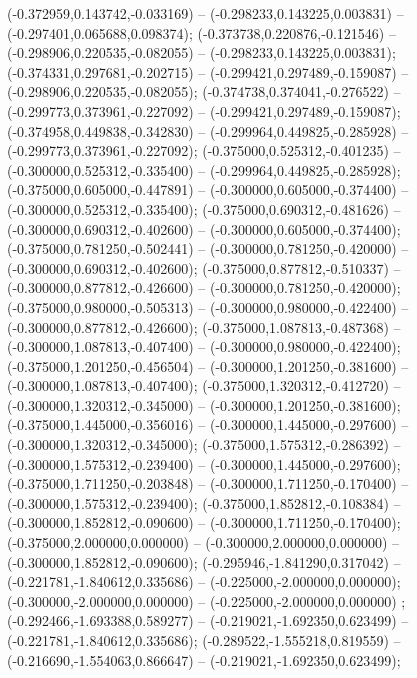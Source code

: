  (-0.372959,0.143742,-0.033169) -- (-0.298233,0.143225,0.003831) -- (-0.297401,0.065688,0.098374);
 (-0.373738,0.220876,-0.121546) -- (-0.298906,0.220535,-0.082055) -- (-0.298233,0.143225,0.003831);
 (-0.374331,0.297681,-0.202715) -- (-0.299421,0.297489,-0.159087) -- (-0.298906,0.220535,-0.082055);
 (-0.374738,0.374041,-0.276522) -- (-0.299773,0.373961,-0.227092) -- (-0.299421,0.297489,-0.159087);
 (-0.374958,0.449838,-0.342830) -- (-0.299964,0.449825,-0.285928) -- (-0.299773,0.373961,-0.227092);
 (-0.375000,0.525312,-0.401235) -- (-0.300000,0.525312,-0.335400) -- (-0.299964,0.449825,-0.285928);
 (-0.375000,0.605000,-0.447891) -- (-0.300000,0.605000,-0.374400) -- (-0.300000,0.525312,-0.335400);
 (-0.375000,0.690312,-0.481626) -- (-0.300000,0.690312,-0.402600) -- (-0.300000,0.605000,-0.374400);
 (-0.375000,0.781250,-0.502441) -- (-0.300000,0.781250,-0.420000) -- (-0.300000,0.690312,-0.402600);
 (-0.375000,0.877812,-0.510337) -- (-0.300000,0.877812,-0.426600) -- (-0.300000,0.781250,-0.420000);
 (-0.375000,0.980000,-0.505313) -- (-0.300000,0.980000,-0.422400) -- (-0.300000,0.877812,-0.426600);
 (-0.375000,1.087813,-0.487368) -- (-0.300000,1.087813,-0.407400) -- (-0.300000,0.980000,-0.422400);
 (-0.375000,1.201250,-0.456504) -- (-0.300000,1.201250,-0.381600) -- (-0.300000,1.087813,-0.407400);
 (-0.375000,1.320312,-0.412720) -- (-0.300000,1.320312,-0.345000) -- (-0.300000,1.201250,-0.381600);
 (-0.375000,1.445000,-0.356016) -- (-0.300000,1.445000,-0.297600) -- (-0.300000,1.320312,-0.345000);
 (-0.375000,1.575312,-0.286392) -- (-0.300000,1.575312,-0.239400) -- (-0.300000,1.445000,-0.297600);
 (-0.375000,1.711250,-0.203848) -- (-0.300000,1.711250,-0.170400) -- (-0.300000,1.575312,-0.239400);
 (-0.375000,1.852812,-0.108384) -- (-0.300000,1.852812,-0.090600) -- (-0.300000,1.711250,-0.170400);
 (-0.375000,2.000000,0.000000) -- (-0.300000,2.000000,0.000000) -- (-0.300000,1.852812,-0.090600);
 (-0.295946,-1.841290,0.317042) -- (-0.221781,-1.840612,0.335686) -- (-0.225000,-2.000000,0.000000);
 (-0.300000,-2.000000,0.000000) -- (-0.225000,-2.000000,0.000000) ;
 (-0.292466,-1.693388,0.589277) -- (-0.219021,-1.692350,0.623499) -- (-0.221781,-1.840612,0.335686);
 (-0.289522,-1.555218,0.819559) -- (-0.216690,-1.554063,0.866647) -- (-0.219021,-1.692350,0.623499);
